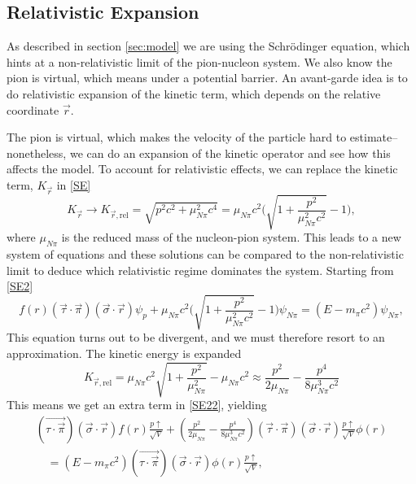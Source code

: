 \subsection{Relativistic Expansion}
As described in section \ref{sec:model} we are using the Schrödinger equation, which hints at a non-relativistic limit of the pion-nucleon system. We also know the pion is virtual, which means under a potential barrier. An avant-garde idea is to do relativistic expansion of the kinetic term, which depends on the relative coordinate $\vec{r}$. 


%
The pion is virtual, which makes the velocity of the particle hard to estimate--nonetheless, we can do an expansion of the kinetic operator and see how this affects the model. To account for relativistic effects, we can replace the kinetic term, $K_{\vec{r}}$ in \eqref{SE}
\begin{equation}
	K_{\vec{r}}\rightarrow K_{\vec{r},\text{rel}} = \sqrt{p^2 c^2+\mu_{N\pi}^2 c^4} = \mu_{N\pi} c^2 \bigg(\sqrt{1+\frac{p^2}{\mu_{N\pi}^2 c^2}}-1 \bigg),
\end{equation}
where $\mu_{N\pi}$ is the reduced mass of the nucleon-pion system. This leads to a new system of equations and these solutions can be compared to the non-relativistic limit to deduce which relativistic regime dominates the system. Starting from \eqref{SE2}
\begin{equation}
	f(r) (\vec{\tau} \cdot \vec{\pi})(\vec{\sigma}\cdot \vec{r})\psi_p + \mu_{N\pi} c^2 \bigg(\sqrt{1+\frac{p^2}{\mu_{N\pi}^2 c^2}}-1 \bigg)\psi_{N\pi} = (E-m_{\pi}c^2)\psi_{N\pi},
\end{equation}
This equation turns out to be divergent, and we must therefore resort to an approximation. The kinetic energy is expanded
\begin{equation}
	K_{\vec{r},\text{rel}} = \mu_{N\pi} c^2\sqrt{1+\frac{p^2}{\mu_{N\pi}^2}}-\mu_{N\pi} c^2 \approx \frac{p^2}{2\mu_{N\pi}}-\frac{p^4}{8\mu_{N\pi}^3 c^2}
\end{equation}
This means we get an extra term in \eqref{SE22}, yielding
\begin{equation}\begin{split}\label{SErel}
		(\vec{\tau\cdot\vec{\pi}})(\vec{\sigma}\cdot\vec{r})f(r)  \frac{p\uparrow}{\sqrt{V}}+\left(\frac{p^2}{2\mu_{N\pi}}-\frac{p^4}{8\mu_{N\pi}^3 c^2} \right)(\vec{\tau}\cdot\vec{\pi})(\vec{\sigma}\cdot\vec{r})\frac{p\uparrow}{\sqrt{V}}\phi(r) \\ \quad= (E-m_\pi c^2) (\vec{\tau\cdot\vec{\pi}})(\vec{\sigma}\cdot\vec{r}) \phi(r)\frac{p\uparrow}{\sqrt{V}},
	\end{split}
\end{equation}
